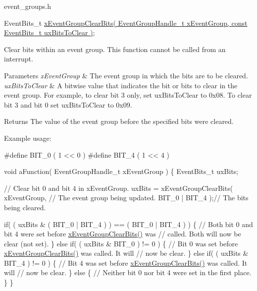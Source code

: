 event\+\_\+groups.\+h 
\begin{DoxyPre}
   EventBits\_t \hyperlink{externals_2freertos_2include_2event__groups_8h_a0fb72cfdd4f0d5f86d955fc3af448f2a}{xEventGroupClearBits( EventGroupHandle\_t xEventGroup, const EventBits\_t uxBitsToClear )};
\end{DoxyPre}


Clear bits within an event group. This function cannot be called from an interrupt.


\begin{DoxyParams}{Parameters}
{\em x\+Event\+Group} & The event group in which the bits are to be cleared.\\
\hline
{\em ux\+Bits\+To\+Clear} & A bitwise value that indicates the bit or bits to clear in the event group. For example, to clear bit 3 only, set ux\+Bits\+To\+Clear to 0x08. To clear bit 3 and bit 0 set ux\+Bits\+To\+Clear to 0x09.\\
\hline
\end{DoxyParams}
\begin{DoxyReturn}{Returns}
The value of the event group before the specified bits were cleared.
\end{DoxyReturn}
Example usage\+: 
\begin{DoxyPre}
  #define BIT\_0 ( 1 << 0 )
  #define BIT\_4 ( 1 << 4 )\end{DoxyPre}



\begin{DoxyPre}  void aFunction( EventGroupHandle\_t xEventGroup )
  \{
  EventBits\_t uxBits;\end{DoxyPre}



\begin{DoxyPre}    // Clear bit 0 and bit 4 in xEventGroup.
    uxBits = xEventGroupClearBits(
                            xEventGroup,    // The event group being updated.
                            BIT\_0 | BIT\_4 );// The bits being cleared.\end{DoxyPre}



\begin{DoxyPre}    if( ( uxBits \& ( BIT\_0 | BIT\_4 ) ) == ( BIT\_0 | BIT\_4 ) )
    \{
        // Both bit 0 and bit 4 were set before \hyperlink{externals_2freertos_2include_2event__groups_8h_a0fb72cfdd4f0d5f86d955fc3af448f2a}{xEventGroupClearBits()} was
        // called.  Both will now be clear (not set).
    \}
    else if( ( uxBits \& BIT\_0 ) != 0 )
    \{
        // Bit 0 was set before \hyperlink{externals_2freertos_2include_2event__groups_8h_a0fb72cfdd4f0d5f86d955fc3af448f2a}{xEventGroupClearBits()} was called.  It will
        // now be clear.
    \}
    else if( ( uxBits \& BIT\_4 ) != 0 )
    \{
        // Bit 4 was set before \hyperlink{externals_2freertos_2include_2event__groups_8h_a0fb72cfdd4f0d5f86d955fc3af448f2a}{xEventGroupClearBits()} was called.  It will
        // now be clear.
    \}
    else
    \{
        // Neither bit 0 nor bit 4 were set in the first place.
    \}
  \}
  \end{DoxyPre}
 